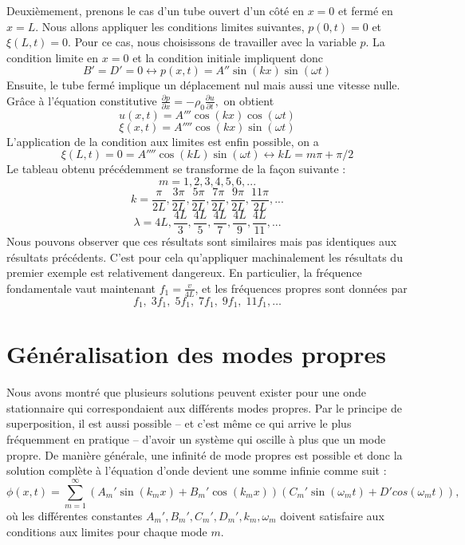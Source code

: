 Deuxièmement, prenons le cas d'un tube ouvert d'un côté en $x=0$ et fermé en $x=L$. Nous allons appliquer les conditions limites suivantes, $p(0,t)=0$ et $\xi(L,t)=0$. Pour ce cas, nous choisissons de travailler avec la variable $p$. La condition limite en $x=0$ et la condition initiale impliquent donc
$$B' = D' = 0 \leftrightarrow p(x,t)=A''\sin(kx)\sin(\omega t)$$
Ensuite, le tube fermé implique un déplacement nul mais aussi une vitesse nulle. Grâce à l'équation constitutive $\frac{\partial p}{\partial x}=-\rho_0\frac{\partial u}{\partial t},$
on obtient
$$u(x,t)=A'''\cos(kx)\cos(\omega t)$$
$$\xi(x,t)=A''''\cos(kx)\sin(\omega t)$$
L'application de la condition aux limites est enfin possible, on a 
$$\xi(L,t)=0=A''''\cos(kL)\sin(\omega t) \leftrightarrow kL=m\pi + \pi/2$$
Le tableau obtenu précédemment se transforme de la façon suivante : 
$$ m = 1,2,3,4,5,6,...$$
$$ k = \frac{\pi}{2L},\frac{3\pi}{2L},\frac{5\pi}{2L},\frac{7\pi}{2L},\frac{9\pi}{2L},\frac{11\pi}{2L},...$$
$$ \lambda = 4L,\frac{4L}{3},\frac{4L}{5},\frac{4L}{7},\frac{4L}{9},\frac{4L}{11},... $$
Nous pouvons observer que ces résultats sont similaires mais pas identiques aux résultats précédents. C'est pour cela qu'appliquer machinalement les résultats du premier exemple est relativement dangereux. En particulier, la fréquence fondamentale vaut maintenant $f_1=\frac{v}{4L}$, et les fréquences propres sont données par
$$ f_1,\; 3f_1,\; 5f_1,\; 7f_1,\; 9f_1,\; 11f_1, \ldots$$

\section{Généralisation des modes propres}
Nous avons montré que plusieurs solutions peuvent exister pour une onde stationnaire qui correspondaient aux différents modes propres. Par le principe de superposition, il est aussi possible -- et c'est même ce qui arrive le plus fréquemment en pratique -- d'avoir un système qui oscille à plus que un mode propre. De manière générale, une infinité de mode propres est possible et donc la solution complète à l'équation d'onde devient une somme infinie comme suit : 
\[ \phi(x,t) = \sum_{m=1}^\infty(A_m'\sin(k_mx) + B_m' \cos(k_mx))(C_m'\sin(\omega_mt) + D' cos(\omega_mt)), \]
où les différentes constantes $A_m',B_m',C_m',D_m', k_m,\omega_m$ doivent satisfaire aux conditions aux limites pour chaque mode $m$.


